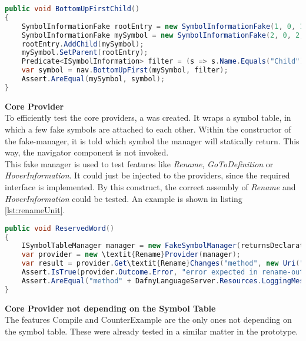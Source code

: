 \begin{lstlisting}[language=csharp, caption={Navigator Unit Test}, captionpos=b, label={lst:botuptest}]
public void BottomUpFirstChild()
{
    SymbolInformationFake rootEntry = new SymbolInformationFake(1, 0, 1, 0, 5, 0, defaultFile, "Parent");
    SymbolInformationFake mySymbol = new SymbolInformationFake(2, 0, 2, 0, 5, 0, defaultFile, "Child");
    rootEntry.AddChild(mySymbol);
    mySymbol.SetParent(rootEntry);
    Predicate<ISymbolInformation> filter = (s => s.Name.Equals("Child"));
    var symbol = nav.BottomUpFirst(mySymbol, filter);
    Assert.AreEqual(mySymbol, symbol);
}
\end{lstlisting}

\textbf{Core Provider}\\
To efficiently test the core providers, a  was created.
It wraps a symbol table, in which a few fake symbols are attached to each other.
Within the constructor of the fake-manager, it is told which symbol the manager will statically return.
This way, the navigator component is not invoked.\\

This fake manager is used to test features like \textit{Rename}, \textit{GoToDefinition} or \textit{HoverInformation}.
It could just be injected to the providers, since the required interface  is implemented.
By this construct, the correct assembly of \textit{Rename} and \textit{HoverInformation} could be tested.
An example is shown in listing \ref{lst:renameUnit}.

\begin{lstlisting}[language=csharp, caption={Core Provider Unit Test}, captionpos=b, label={lst:renameUnit}]
public void ReservedWord()
{
    ISymbolTableManager manager = new FakeSymbolManager(returnsDeclaration: false, returnsNull: false);
    var provider = new \textit{Rename}Provider(manager);
    var result = provider.Get\textit{Rename}Changes("method", new Uri("file:///N:/u/l.l"), 2, 22);
    Assert.IsTrue(provider.Outcome.Error, "error expected in rename-outcome");
    Assert.AreEqual("method" + DafnyLanguageServer.Resources.LoggingMessages.rename_reserved_word, provider.Outcome.Msg);
}
\end{lstlisting}

\textbf{Core Provider not depending on the Symbol Table}\\
The features Compile and CounterExample are the only ones not depending on the symbol table.
These were already tested in a similar matter in the prototype.\\

